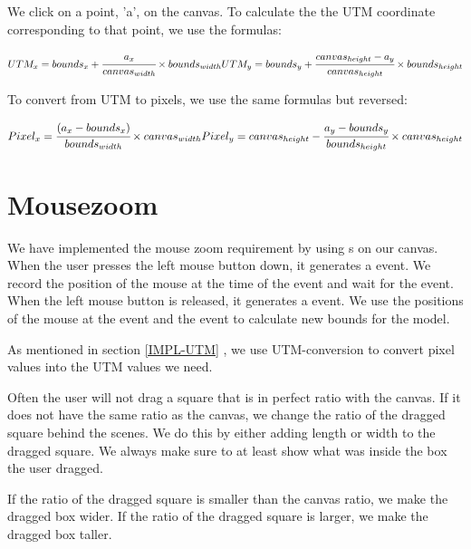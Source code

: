 We click on a point, 'a', on the canvas. To calculate the the UTM coordinate
corresponding to that point, we use the formulas:

$
UTM_x = bounds_x + \cfrac{a_x}{canvas_{width}} \times bounds_{width}\\
\\
UTM_y = bounds_y + \cfrac{canvas_{height} - a_y}{canvas_{height}} \times bounds_{height}\\
\\
$

To convert from UTM to pixels, we use the same formulas but reversed:

$
\\
Pixel_x = \cfrac{(a_x - bounds_x)}{bounds_{width}} \times
canvas_{width}\\
\\
Pixel_y = canvas_{height} - \cfrac{a_y - bounds_y}{bounds_{height}} \times
canvas_{height}\\
\\
$

\section{Mousezoom}
\label{IMPL-MZ}
We have implemented the mouse zoom requirement by using s on
our canvas. When the user presses the left mouse button down, it generates a
 event. We record the position of the mouse at the time of
the  event and wait for the  event.
When the left mouse button is released, it generates a 
event. We use the positions of the mouse at the  event and
the  event to calculate new bounds for the model.

As mentioned in section \ref{IMPL-UTM} , we use
UTM-conversion to convert pixel values into the UTM values we need.

Often the user will not drag a square that is in perfect ratio with the
canvas. If it does not have the same ratio as the canvas, we change the ratio
of the dragged square behind the scenes. We do this by either adding length or
width to the dragged square. We always make sure to at least show what was
inside the box the user dragged.

If the ratio of the dragged square is smaller than the canvas ratio, we make the
dragged box wider. If the ratio of the dragged square is larger, we make the
dragged box taller.

